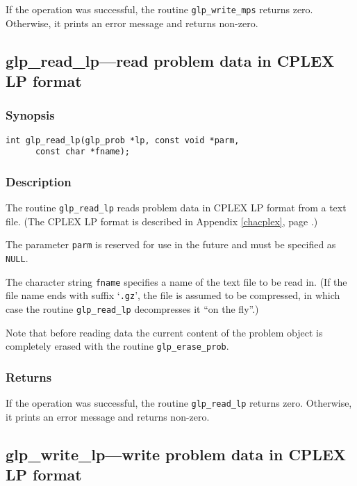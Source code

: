 If the operation was successful, the routine \verb|glp_write_mps|
returns zero. Otherwise, it prints an error message and returns
non-zero.

\subsection{glp\_read\_lp---read problem data in CPLEX LP format}

\subsubsection*{Synopsis}

\begin{verbatim}
int glp_read_lp(glp_prob *lp, const void *parm,
      const char *fname);
\end{verbatim}

\subsubsection*{Description}

The routine \verb|glp_read_lp| reads problem data in CPLEX LP format
from a text file. (The CPLEX LP format is described in Appendix
\ref{chacplex}, page \pageref{chacplex}.)

The parameter \verb|parm| is reserved for use in the future and must be
specified as \verb|NULL|.

The character string \verb|fname| specifies a name of the text file to
be read in. (If the file name ends with suffix `\verb|.gz|', the file is
assumed to be compressed, in which case the routine \verb|glp_read_lp|
decompresses it ``on the fly''.)

Note that before reading data the current content of the problem object
is completely erased with the routine \verb|glp_erase_prob|.

\subsubsection*{Returns}

If the operation was successful, the routine \verb|glp_read_lp| returns
zero. Otherwise, it prints an error message and returns non-zero.

\subsection{glp\_write\_lp---write problem data in CPLEX LP format}

